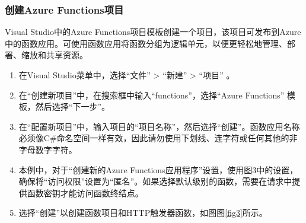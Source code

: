 \subsubsection{创建Azure Functions项目} 
Visual Studio中的Azure Functions项目模板创建一个项目，该项目可发布到Azure中的函数应用。可使用函数应用将函数分组为逻辑单元，以便更轻松地管理、部署、缩放和共享资源。
\begin{enumerate}
	\item 在Visual Studio菜单中，选择“文件” > “新建” > “项目” 。
	\item 在“创建新项目”中，在搜索框中输入“functions”，选择“Azure Functions” 模板，然后选择“下一步”。
	\item 在“配置新项目”中，输入项目的“项目名称”，然后选择“创建”。函数应用名称必须像C\#命名空间一样有效，因此请勿使用下划线、连字符或任何其他的非字母数字字符。
	\item 本例中，对于“创建新的Azure Functions应用程序”设置，使用图3中的设置，确保将“访问权限”设置为“匿名”。如果选择默认级别的函数，需要在请求中提供函数密钥才能访问函数终结点。
	\item 选择“创建”以创建函数项目和HTTP触发器函数，如图图\ref{fig3}所示。
\end{enumerate}
